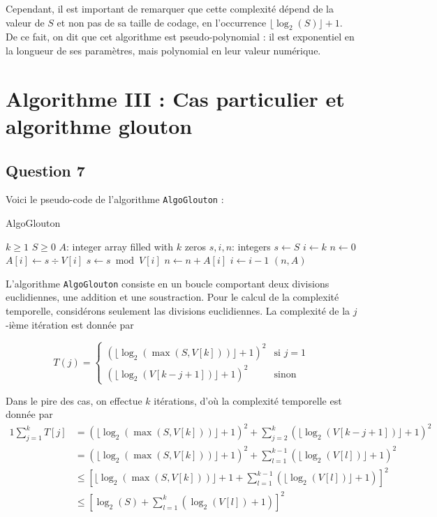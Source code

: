 \documentclass[12pt,a4paper]{article}
\begin{document}
 Cependant, il est important de remarquer que cette complexit\'e d\'epend de la valeur de $S$ et non pas de sa taille de codage, en l'occurrence $\lfloor \log_2(S)\rfloor + 1$.
 De ce fait, on dit que cet algorithme est pseudo-polynomial : il est exponentiel en la longueur de ses param\`etres, mais polynomial en leur valeur num\'erique.

\newpage
\section{Algorithme III : Cas particulier et algorithme glouton}

\subsection*{Question 7}
Voici le pseudo-code de l'algorithme \texttt{AlgoGlouton} :

\begin{algorithm}
\caption{AlgoGlouton}
\begin{algorithmic}[1]
\Require $k \geq 1$ \AND $S \geq 0$
	\State $A$: integer array filled with $k$ zeros
    \State $s, i, n$: integers
    \State $s \gets S$
    \State $i \gets k$
    \State $n \gets 0$
    	\State $A[i] \gets s \div V[i] $
        \State $s \gets s \bmod V[i] $
        \State $n \gets n+A[i]$
        \State $i \gets i-1$
    \EndWhile
    \State \Return $(n, A)$
\EndFunction
\end{algorithmic}
\end{algorithm}

L'algorithme \texttt{AlgoGlouton} consiste en un boucle comportant deux divisions euclidiennes, une addition et une soustraction. 
Pour le calcul de la complexit\'e temporelle, consid\'erons seulement las divisions euclidiennes.
La complexit\'e de la $j$-i\`eme it\'eration est donn\'ee par

\begin{equation*}
T(j) = 
\begin{cases}
(\lfloor \log_2(\max(S, V[k])) \rfloor + 1)^2 & \text{si } j = 1 \\
(\lfloor \log_2(V[k-j+1]) \rfloor + 1)^2 & \text{sinon}
\end{cases}
\end{equation*}

Dans le pire des cas, on effectue $k$ it\'erations, d'o\`u la complexit\'e temporelle est donn\'ee par
\begin{alignat*}{1}
 \sum_{j=1}^{k} T[j] &= (\lfloor \log_2(\max(S, V[k])) \rfloor + 1)^2 + \sum_{j=2}^{k} (\lfloor \log_2(V[k-j+1]) \rfloor + 1)^2 \\
                    &= (\lfloor \log_2(\max(S, V[k])) \rfloor + 1)^2 + \sum_{l=1}^{k-1} (\lfloor \log_2(V[l]) \rfloor + 1)^2 \\
                    &\leq \left[\lfloor \log_2(\max(S, V[k])) \rfloor + 1 + \sum_{l=1}^{k-1} (\lfloor \log_2(V[l]) \rfloor + 1)\right]^2 \\
                    &\leq \left[\log_2(S) + \sum_{l=1}^{k} (\log_2(V[l]) + 1)\right]^2
\end{alignat*}
\end{document}
